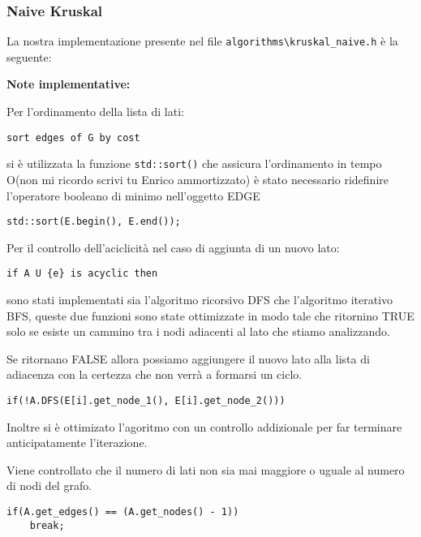\documentclass[]{article}
\begin{document}
\subsubsection{Naive Kruskal}
\begin{flushleft}
La nostra implementazione presente nel file \verb|algorithms\kruskal_naive.h| è la seguente:

\lstset{language=c++, style=mystyle}


\textbf{Note implementative:}

\medskip
Per l'ordinamento della lista di lati:

\begin{lstlisting}
sort edges of G by cost
\end{lstlisting}

\smallskip
si è utilizzata la funzione \verb|std::sort()| che assicura l'ordinamento in tempo O(non mi ricordo scrivi tu Enrico ammortizzato)%
 è stato necessario ridefinire l'operatore booleano di minimo nell'oggetto EDGE
 
\lstset{language=c++, style=mystyle, firstnumber=2} 	 	
\begin{lstlisting}
std::sort(E.begin(), E.end());
\end{lstlisting}

\medskip
Per il controllo dell'aciclicità nel caso di aggiunta di un nuovo lato:

\begin{lstlisting}
if A U {e} is acyclic then
\end{lstlisting}

\smallskip
sono stati implementati sia l'algoritmo ricorsivo DFS che l'algoritmo iterativo BFS, queste due funzioni sono state ottimizzate in modo tale che ritornino TRUE solo se esiste un cammino tra i nodi adiacenti al lato che stiamo analizzando.

Se ritornano FALSE allora possiamo aggiungere il nuovo lato alla lista di adiacenza con la certezza che non verrà a formarsi un ciclo.

\lstset{language=c++, style=mystyle, firstnumber=4}
\begin{lstlisting}
if(!A.DFS(E[i].get_node_1(), E[i].get_node_2()))
\end{lstlisting}

\medskip
Inoltre si è ottimizato l'agoritmo con un controllo addizionale per far terminare anticipatamente l'iterazione. 

Viene controllato che il numero di lati non sia mai maggiore o uguale al numero di nodi del grafo.

\lstset{language=c++, style=mystyle, firstnumber=6}
\begin{lstlisting}
if(A.get_edges() == (A.get_nodes() - 1))
    break;
\end{lstlisting}
\end{flushleft}
\end{document}

